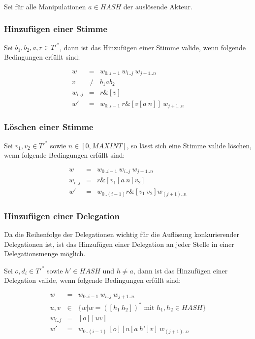 \documentclass[a4paper,12pt]{report}
\begin{document}
Sei für alle Manipulationen $a\in HASH$ der auslösende Akteur.

\subsubsection*{Hinzufügen einer Stimme}
Sei $b_1,b_2,v,r \in T'^*$, dann ist das Hinzufügen einer Stimme valide, wenn folgende Bedingungen erfüllt sind:

\begin{eqnarray}
  w &=& w_{0 .. i-1}\ w_{i..j}\ w_{j+1 .. n} \\
  v &\neq& b_1 a b_2 \\
  w_{i..j} &=& r\& [v] \\
  w' &=& w_{0 .. i-1}\ r \& [v[a\ n]]\ w_{j+1 .. n}
\end{eqnarray}

\subsubsection*{Löschen einer Stimme}

Sei $v_1, v_2 \in T'^*$ sowie $n\in[0,MAXINT]$, so lässt sich eine Stimme valide löschen, wenn folgende Bedingungen erfüllt sind:

\begin{eqnarray}
  w &=& w_{0 .. i-1}\ w_{i..j}\ w_{j+1 .. n} \\
  w_{i..j}&=& r\& [v_1 [a\ n] v_2] \\
  w' &=& w_{0..(i-1)} r\& [v_1\ v_2] w_{(j+1)..n}
\end{eqnarray}


\subsubsection*{Hinzufügen einer Delegation}
Da die Reihenfolge der Delegationen wichtig für die Auflösung konkurierender Delegationen ist, ist das Hinzufügen einer Delegation an jeder Stelle in einer Delegationsmenge möglich.

Sei $o,d_i \in T'^*$ sowie $h'\in HASH$ und $h\neq a$, dann ist das Hinzufügen einer Delegation valide, wenn folgende Bedingungen erfüllt sind:

\begin{eqnarray}
  w &=& w_{0 .. i-1}\ w_{i..j}\ w_{j+1 .. n} \\
  u,v &\in& \{ w | w = ([h_1\ h_2])^*\text{ mit } h_1,h_2 \in HASH \} \\
  w_{i..j} &=& [o][uv] \\
  w' &=& w_{0 .. (i-1)}\ [o][u[a\ h']v]\ w_{(j+1) .. n}
\end{eqnarray}
\end{document}
